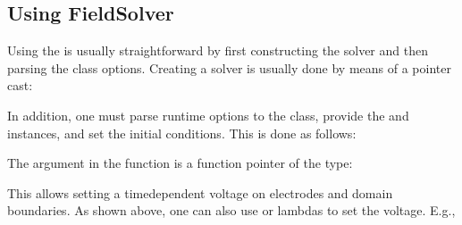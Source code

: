 \documentclass[letterpaper,10pt,english]{sphinxmanual}
\begin{document}
\subsection{Using FieldSolver}
\label{\detokenize{Solvers/Electrostatics:using-fieldsolver}}
Using the  is usually straightforward by first constructing the solver and then parsing the class options.
Creating a solver is usually done by means of a pointer cast:

\begin{sphinxVerbatim}[commandchars=\\\{\},formatcom=\scriptsize]
     
\end{sphinxVerbatim}

In addition, one must parse run\sphinxhyphen{}time options to the class, provide the  and  instances, and set the initial conditions.
This is done as follows:

The argument in the function  is a function pointer of the type:

\begin{sphinxVerbatim}[commandchars=\\\{\},formatcom=\scriptsize]
   
\end{sphinxVerbatim}

This allows setting a time\sphinxhyphen{}dependent voltage on electrodes and domain boundaries.
As shown above, one can also use  or lambdas to set the voltage.
E.g.,

\begin{sphinxVerbatim}[commandchars=\\\{\},formatcom=\scriptsize]
 

   \PYG{p}{[}\PYG{p}{]}      
    

\end{sphinxVerbatim}
\end{document}

